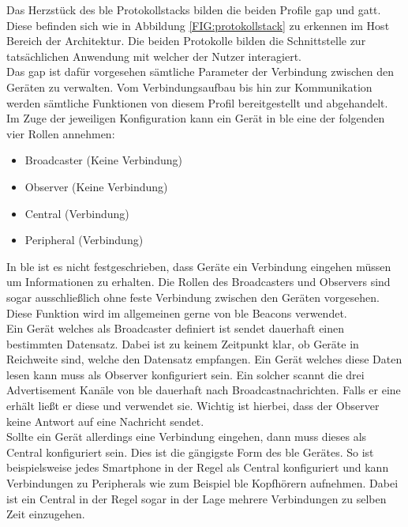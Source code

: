 \noindent Das Herzstück des \ac{ble} Protokollstacks bilden die beiden Profile \ac{gap} und \ac{gatt}. Diese befinden sich wie in Abbildung \ref{FIG:protokollstack} zu erkennen im Host Bereich der Architektur. Die beiden Protokolle bilden die Schnittstelle zur tatsächlichen Anwendung mit welcher der Nutzer interagiert.\\

\noindent Das \ac{gap} ist dafür vorgesehen sämtliche Parameter der Verbindung zwischen den Geräten zu verwalten. Vom Verbindungsaufbau bis hin zur Kommunikation werden sämtliche Funktionen von diesem Profil bereitgestellt und abgehandelt.\\

\noindent Im Zuge der jeweiligen Konfiguration kann ein Gerät in \ac{ble} eine der folgenden vier Rollen annehmen:
\begin{itemize}
	\item{Broadcaster (Keine Verbindung)}
	\item{Observer (Keine Verbindung)}
	\item{Central (Verbindung)}
	\item{Peripheral (Verbindung)}
\end{itemize}   

\noindent In \ac{ble} ist es nicht festgeschrieben, dass Geräte ein Verbindung eingehen müssen um Informationen zu erhalten. Die Rollen des Broadcasters und Observers sind sogar ausschließlich ohne feste Verbindung zwischen den Geräten vorgesehen. Diese Funktion wird im allgemeinen gerne von \ac{ble} Beacons verwendet.\\

\noindent Ein Gerät welches als Broadcaster definiert ist sendet dauerhaft einen bestimmten Datensatz. Dabei ist zu keinem Zeitpunkt klar, ob Geräte in Reichweite sind, welche den Datensatz empfangen. Ein Gerät welches diese Daten lesen kann muss als Observer konfiguriert sein. Ein solcher scannt die drei Advertisement Kanäle von \ac{ble} dauerhaft nach Broadcastnachrichten. Falls er eine erhält ließt er diese und verwendet sie. Wichtig ist hierbei, dass der Observer keine Antwort auf eine Nachricht sendet.\\  

\noindent Sollte ein Gerät allerdings eine Verbindung eingehen, dann muss dieses als Central konfiguriert sein. Dies ist die gängigste Form des \ac{ble} Gerätes. So ist beispielsweise jedes Smartphone in der Regel als Central konfiguriert und kann Verbindungen zu Peripherals wie zum Beispiel \ac{ble} Kopfhörern aufnehmen. Dabei ist ein Central in der Regel sogar in der Lage mehrere Verbindungen zu selben Zeit einzugehen.\\


